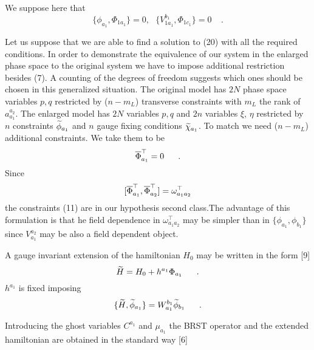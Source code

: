 \documentclass[a4paper,10pt]{article}
\begin{document}
We suppose here that
\begin{equation}
\label{10}
\{\phi_{a_1},\Phi_{1a_1}\}=0,\ \ \ \{V_{1a_1}^{b_1},\Phi_{1c_1}\}=0
\ \ \ \ \ .
\end{equation}


Let us suppose that we are able to find a solution to (20) with all the
required conditions. In order to demonstrate the equivalence of our system in
the enlarged phase  space to the original system we have to impose additional
restriction besides  (7). A counting of the degrees of freedom suggests which
ones should be  chosen in this generalized situation. The original model has
$2N$ phase  space variables $p,q$ restricted by ($n-m_L$) transverse constraints
with  $m_L$ the rank of $a^{a_2}_{a_1}$. The enlarged model has $2N$ variables
$p,q$ and $2n$ variables $\xi$, $\eta$ restricted by $n$ constraints
$\widetilde{\phi}_{a_1}$ and $n$ gauge fixing conditions $\widetilde{\chi}_{a_1}$. To match
we need ($n-m_L$) additional constraints. We take them to be
\begin{equation}
\label{11}
\overline{\Phi}_{a_1}^\top =0\ \ \ \ \ .
\end{equation}
Since
\begin{equation}
\label{12}
[\overline{\Phi}_{a_1}^\top ,\overline{\Phi}_{a_2}^\top ]=\omega_{a_1a_2}^\top
\end{equation}
the constraints (11) are in our hypothesis second class.The advantage of
this formulation is that he field dependence in $\omega^{\top}_{a_1a_2}$   may
be simpler than in $\{\phi_{a_1},\phi_{b_1}\}$ since  $V_{a_1}^{a_2}$ may be
also a field dependent object.

A gauge invariant extension of the hamiltonian $H_0$ may be written in the
form [9]
\begin{equation}
\label{13}
\widetilde{H}=H_0+h^{a_1}\Phi_{a_1}\ \ \ \ \ .
\end{equation}
$h^{a_1}$ is fixed imposing
\begin{equation}
\label{14}
\{\wt{H},\wt{\phi}_{a_1}\} =W_{a_1}^{b_1}\wt{\phi}_{b_1}\ \ \ \ \ .
\end{equation}


Introducing the ghost variables $C^{a_1}$ and $\mu_{a_1}$ the BRST operator
and the extended hamiltonian are obtained in the standard way [6]
\end{document}

